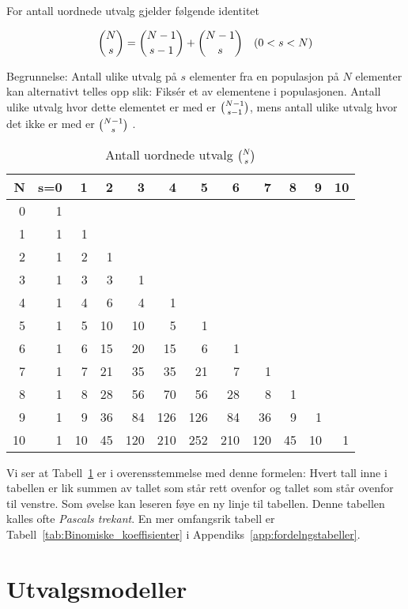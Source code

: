 \noindent     For antall uordnede utvalg gjelder følgende identitet

\[ \bino{N}{s}=\bino{N-1}{s-1}+\bino{N-1}{s}  \mbox{\ \ \  } (0 < s < N)\]

\noindent Begrunnelse: Antall ulike utvalg på $s$ elementer fra en
populasjon på $N$ elementer kan alternativt telles opp slik:
Fiks\'{e}r et av elementene i populasjonen. Antall ulike utvalg hvor
dette elementet er med er ${{N-1}\choose{s-1}}$, mens antall ulike utvalg
hvor det ikke er med er ${{N-1}\choose{s}}$ .

\begin{table}
\begin{tabular}{|r|rrrrrrrrrrr|} \hline
N&s=0&1&2&3&4&5&6&7&8&9&10 \\ \hline
0&  1& & & & & & & & & &   \\ 
1&  1&1& & & & & & & & &   \\ 
2&  1&2&1& & & & & & & &  \\
3&  1&3&3&1& & & & & & &  \\
4&  1&4&6&4&1& & & & & & \\
5&  1&5&10&10&5&1& & & & &  \\
6&  1&6&15&20&15&6&1& & & & \\
7&  1&7&21&35&35&21&7&1& &  &  \\
8&  1&8&28&56&70&56&28&8&1& &  \\
9&  1&9&36&84&126&126&84&36&9&1&  \\
10& 1&10&45&120&210&252&210&120&45&10&1\\[2mm]
\hline
\end{tabular}
\caption{Antall uordnede utvalg ${{N}\choose{s}}$}
\label{tab:antall_uordnede}
\end{table}

Vi ser at Tabell~\ref{tab:antall_uordnede} er i overensstemmelse med denne formelen:
Hvert tall inne i tabellen er lik summen av tallet som står rett
ovenfor og tallet som står ovenfor til venstre. Som øvelse kan
leseren føye en ny linje til tabellen. Denne tabellen kalles ofte
{\em Pascals trekant}. En mer omfangsrik tabell er Tabell~\ref{tab:Binomiske_koeffisienter} i
Appendiks~\ref{app:fordelngstabeller}.

\section{Utvalgsmodeller}

